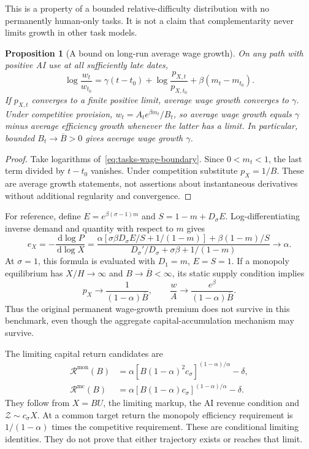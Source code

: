 \documentclass[11pt]{article}
\newtheorem{proposition}{Proposition}
\newcommand{\dd}{\,\mathrm d}
\begin{document}
This is a property of a bounded relative-difficulty distribution with no
permanently human-only tasks. It is not a claim that complementarity never
limits growth in other task models.

\begin{proposition}[A bound on long-run average wage growth]
On any path with positive AI use at all sufficiently late dates,
\begin{equation}
 \log\frac{w_t}{w_{t_0}}=\gamma(t-t_0)
 +\log\frac{p_{X,t}}{p_{X,t_0}}+\beta(m_t-m_{t_0}).
 \label{eq:tasks-wage-growth}
\end{equation}
If $p_{X,t}$ converges to a finite positive limit, average wage growth
converges to $\gamma$. Under competitive provision,
$w_t=A_t e^{\beta m_t}/B_t$, so average wage growth equals
$\gamma$ minus average efficiency growth whenever the latter has a limit.
In particular, bounded $B_t\to\overline B>0$ gives average wage growth $\gamma$.
\end{proposition}
\begin{proof}
Take logarithms of~\eqref{eq:tasks-wage-boundary}. Since $0<m_t<1$,
the last term divided by $t-t_0$ vanishes. Under competition substitute
$p_X=1/B$. These are average growth statements, not assertions about
instantaneous derivatives without additional regularity and convergence.
\end{proof}

For reference, define $E=e^{\beta(\sigma-1)m}$ and $S=1-m+D_\sigma E$.
Log-differentiating inverse demand and quantity with respect to $m$ gives
\begin{equation}
 e_X=-\frac{\dd\log P}{\dd\log X}
 =\frac{\alpha[\sigma\beta D_\sigma E/S+1/(1-m)]+\beta(1-m)/S}
 {D_\sigma'/D_\sigma+\sigma\beta+1/(1-m)}\longrightarrow\alpha.
 \label{eq:tasks-demand-elasticity}
\end{equation}
At $\sigma=1$, this formula is evaluated with $D_1=m$, $E=S=1$.
If a monopoly equilibrium has $X/H\to\infty$ and $B\to\overline B<\infty$,
its static supply condition implies
\[
 p_X\to\frac1{(1-\alpha)\overline B},\qquad
 \frac wA\to\frac{e^\beta}{(1-\alpha)\overline B}.
\]
Thus the original permanent wage-growth premium does not survive in this
benchmark, even though the aggregate capital-accumulation mechanism may survive.

The limiting capital return candidates are
\begin{align}
 \mathcal R^{\mathrm{mon}}(B)&=
 \alpha[B(1-\alpha)^2c_\sigma]^{(1-\alpha)/\alpha}-\delta,\\
 \mathcal R^{\mathrm{mc}}(B)&=
 \alpha[B(1-\alpha)c_\sigma]^{(1-\alpha)/\alpha}-\delta.
\end{align}
They follow from $X=BU$, the limiting markup, the AI revenue condition and
$\mathcal Z\sim c_\sigma X$. At a common target return the monopoly efficiency
requirement is $1/(1-\alpha)$ times the competitive requirement.
These are conditional limiting identities. They do not prove that either
trajectory exists or reaches that limit.
\end{document}

